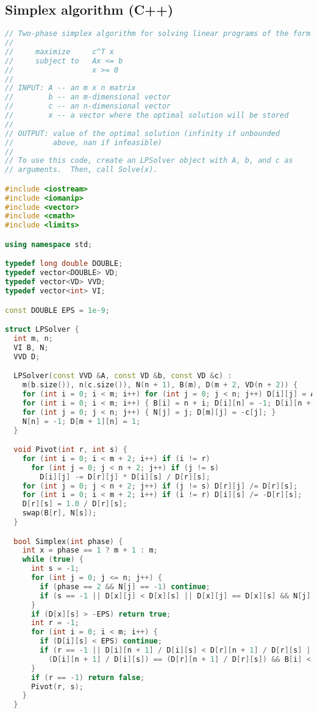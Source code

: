 \subsection{Simplex algorithm (C++)}
\begin{lstlisting}[language=C++]
// Two-phase simplex algorithm for solving linear programs of the form
//
//     maximize     c^T x
//     subject to   Ax <= b
//                  x >= 0
//
// INPUT: A -- an m x n matrix
//        b -- an m-dimensional vector
//        c -- an n-dimensional vector
//        x -- a vector where the optimal solution will be stored
//
// OUTPUT: value of the optimal solution (infinity if unbounded
//         above, nan if infeasible)
//
// To use this code, create an LPSolver object with A, b, and c as
// arguments.  Then, call Solve(x).

#include <iostream>
#include <iomanip>
#include <vector>
#include <cmath>
#include <limits>

using namespace std;

typedef long double DOUBLE;
typedef vector<DOUBLE> VD;
typedef vector<VD> VVD;
typedef vector<int> VI;

const DOUBLE EPS = 1e-9;

struct LPSolver {
  int m, n;
  VI B, N;
  VVD D;

  LPSolver(const VVD &A, const VD &b, const VD &c) :
    m(b.size()), n(c.size()), N(n + 1), B(m), D(m + 2, VD(n + 2)) {
    for (int i = 0; i < m; i++) for (int j = 0; j < n; j++) D[i][j] = A[i][j];
    for (int i = 0; i < m; i++) { B[i] = n + i; D[i][n] = -1; D[i][n + 1] = b[i]; }
    for (int j = 0; j < n; j++) { N[j] = j; D[m][j] = -c[j]; }
    N[n] = -1; D[m + 1][n] = 1;
  }

  void Pivot(int r, int s) {
    for (int i = 0; i < m + 2; i++) if (i != r)
      for (int j = 0; j < n + 2; j++) if (j != s)
        D[i][j] -= D[r][j] * D[i][s] / D[r][s];
    for (int j = 0; j < n + 2; j++) if (j != s) D[r][j] /= D[r][s];
    for (int i = 0; i < m + 2; i++) if (i != r) D[i][s] /= -D[r][s];
    D[r][s] = 1.0 / D[r][s];
    swap(B[r], N[s]);
  }

  bool Simplex(int phase) {
    int x = phase == 1 ? m + 1 : m;
    while (true) {
      int s = -1;
      for (int j = 0; j <= n; j++) {
        if (phase == 2 && N[j] == -1) continue;
        if (s == -1 || D[x][j] < D[x][s] || D[x][j] == D[x][s] && N[j] < N[s]) s = j;
      }
      if (D[x][s] > -EPS) return true;
      int r = -1;
      for (int i = 0; i < m; i++) {
        if (D[i][s] < EPS) continue;
        if (r == -1 || D[i][n + 1] / D[i][s] < D[r][n + 1] / D[r][s] ||
          (D[i][n + 1] / D[i][s]) == (D[r][n + 1] / D[r][s]) && B[i] < B[r]) r = i;
      }
      if (r == -1) return false;
      Pivot(r, s);
    }
  }


\end{lstlisting}
